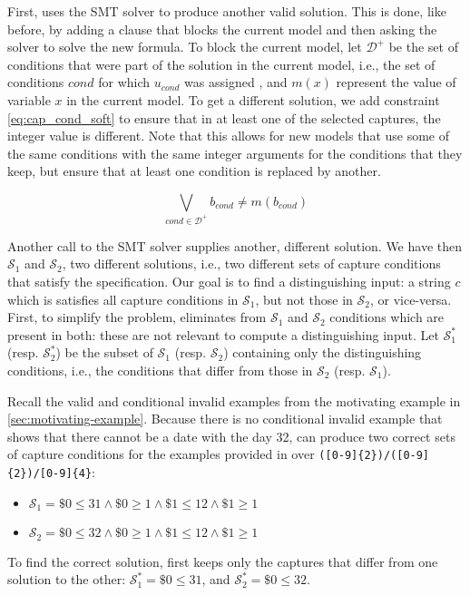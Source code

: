 First, \Forest uses the \ac{SMT} solver to produce another valid solution. This is done, like before, by adding a clause that blocks the current model and then asking the solver to solve the new formula.
%
To block the current model, let \(\mathcal{D^+}\) be the set of conditions that were part of the solution in the current model, i.e., the set of conditions \(\textit{cond}\) for which \(u_{\textit{cond}}\) was assigned \true, and \(m(x)\) represent the value of variable \(x\) in the current model.
To get a different solution, we add constraint \ref{eq:cap_cond_soft} to ensure that in at least one of the selected captures, the integer value is different. Note that this allows for new models that use some of the same conditions with the same integer arguments for the conditions that they keep, but ensure that at least one condition is replaced by another.

\begin{equation}\label{eq:cap_cond_soft}
\bigvee_{\textit{cond} \in \mathcal{D^+}} b_{\textit{cond}} \ne m(b_{\textit{cond}})
\end{equation}

Another call to the \ac{SMT} solver supplies another, different solution. We have then \(\mathcal{S}_1\) and \(\mathcal{S}_2\), two different solutions, i.e., two different sets of capture conditions that satisfy the specification. Our goal is to find a distinguishing input: a string \(c\) which is satisfies all capture conditions in \(\mathcal{S}_1\), but not those in \(\mathcal{S}_2\), or vice-versa. First, to simplify the problem, \Forest eliminates from \(\mathcal{S}_1\) and \(\mathcal{S}_2\) conditions which are present in both: these are not relevant to compute a distinguishing input. Let \(\mathcal{S}_1^*\) (resp. \(\mathcal{S}_2^*\)) be the subset of \(\mathcal{S}_1\) (resp. \(\mathcal{S}_2\)) containing only the distinguishing conditions, i.e., the conditions that differ from those in  \(\mathcal{S}_2\) (resp. \(\mathcal{S}_1\)).

\begin{example}\label{ex:cond_cap_keep_distinct}
Recall the valid and conditional invalid examples from the motivating example in \autoref{sec:motivating-example}. Because there is no conditional invalid example that shows that there cannot be a date with the day 32, \Forest can produce two correct sets of capture conditions for the examples provided in  over \verb`([0-9]{2})/([0-9]{2})/[0-9]{4}`:
\begin{itemize}
    \item \(\mathcal{S}_1 = \$0 \le 31 \wedge \$0 \ge 1 \wedge \$1 \le 12 \wedge \$1 \ge 1\)
    \item \(\mathcal{S}_2 = \$0 \le 32 \wedge \$0 \ge 1 \wedge \$1 \le 12 \wedge \$1 \ge 1\)
\end{itemize}
To find the correct solution, \Forest first keeps only the captures that differ from one solution to the other: \(\mathcal{S}_1^* = \$0 \le 31\), and \(\mathcal{S}_2^* = \$0 \le 32\).
\end{example}

